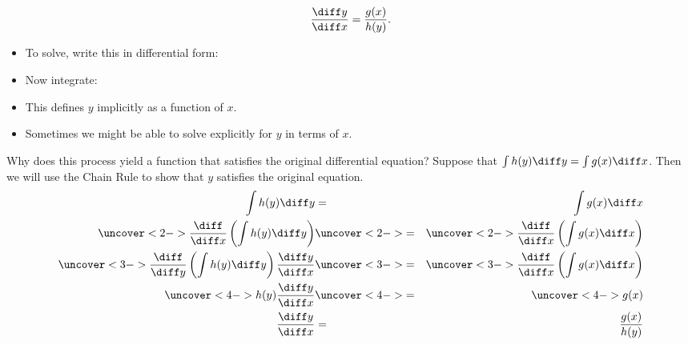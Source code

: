 \begin{frame}
\[
\frac{\diff y}{\diff x} = \frac{g(x)}{h(y)}.
\]
\begin{itemize}
\item<2->  To solve, write this in differential form:
%
\item<3->  Now integrate:
%
\item<4->  This defines $y$ implicitly as a function of $x$.
\item<5->  Sometimes we might be able to solve explicitly for $y$ in terms of $x$.
\end{itemize}
\end{frame}

\begin{frame}
Why does this process yield a function that satisfies the original differential equation?  Suppose that $\int h(y) \diff y = \int g(x) \diff x$.  Then we will use the Chain Rule to show that $y$ satisfies the original equation.
\begin{eqnarray*}
\int h(y) \diff y & = & \int g(x) \diff x\\
\uncover<2->{%
\frac{\diff}{\diff x}\left( \int h(y)\diff y\right)%
}%
& \uncover<2->{ = } &%
\uncover<2->{%
\frac{\diff}{\diff x}\left( \int g(x)\diff x\right)%
}\\%
\uncover<3->{%
\frac{\diff}{\diff y}\left( \int h(y)\diff y\right)\frac{\diff  y}{\diff x}%
}%
& \uncover<3->{ = } &%
\uncover<3->{%
\frac{\diff}{\diff x}\left( \int g(x)\diff x\right)%
}\\%
\uncover<4->{%
h(y) \frac{\diff y}{\diff x}%
}%
& \uncover<4->{ = } &%
\uncover<4->{%
g(x)%
}\\%
\frac{\diff y}{\diff x} & = & \frac{g(x)}{h(y)}
\end{eqnarray*}
\end{frame}
